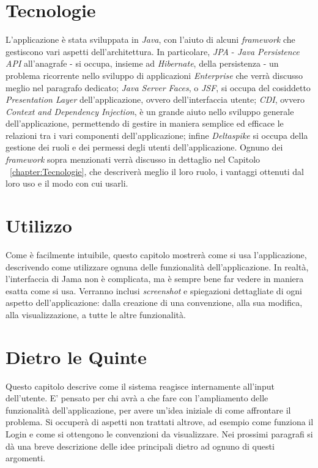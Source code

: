 \section{Tecnologie}
L'applicazione è stata sviluppata in \textsl{Java}, con l'aiuto di alcuni \textit{framework} che gestiscono vari aspetti dell'architettura. In particolare, \textsl{JPA} - \textsl{Java Persistence API} all'anagrafe - si occupa, insieme ad \textsl{Hibernate}, della persistenza - un problema ricorrente nello sviluppo di applicazioni \textit{Enterprise}  che verrà discusso meglio nel paragrafo dedicato; \textsl{Java Server Faces}, o \textsl{JSF}, si occupa del cosiddetto \textsl{Presentation Layer} dell'applicazione, ovvero dell'interfaccia utente; \textsl{CDI}, ovvero \textsl{Context and Dependency Injection}, è un grande aiuto nello sviluppo generale dell'applicazione, permettendo di gestire in maniera semplice ed efficace le relazioni tra i vari componenti dell'applicazione; infine \textsl{Deltaspike} si occupa della gestione dei ruoli e dei permessi degli utenti dell'applicazione.\newline
Ognuno dei \textit{framework} sopra menzionati verrà discusso in dettaglio  nel Capitolo ~\ref{chapter:Tecnologie}, che descriverà meglio il loro ruolo, i vantaggi ottenuti dal loro uso e il modo con cui usarli.
\section{Utilizzo}
Come è facilmente intuibile, questo capitolo mostrerà come si usa l'applicazione, descrivendo come utilizzare ognuna delle funzionalità dell'applicazione. In realtà, l'interfaccia di Jama non è complicata, ma è sempre bene far vedere in maniera esatta come si usa. Verranno inclusi \textit{screenshot} e spiegazioni dettagliate di ogni aspetto dell'applicazione: dalla creazione di una convenzione, alla sua modifica, alla visualizzazione, a tutte le altre funzionalità.
\section{Dietro le Quinte}
Questo capitolo descrive come il sistema reagisce internamente all'input dell'utente. E' pensato per chi avrà a che fare con l'ampliamento delle funzionalità dell'applicazione, per avere un'idea iniziale di come affrontare il problema. Si occuperà di aspetti non trattati altrove, ad esempio come funziona il Login e come si ottengono le convenzioni da visualizzare.
Nei prossimi paragrafi si dà una breve descrizione delle idee principali dietro ad ognuno di questi argomenti.
